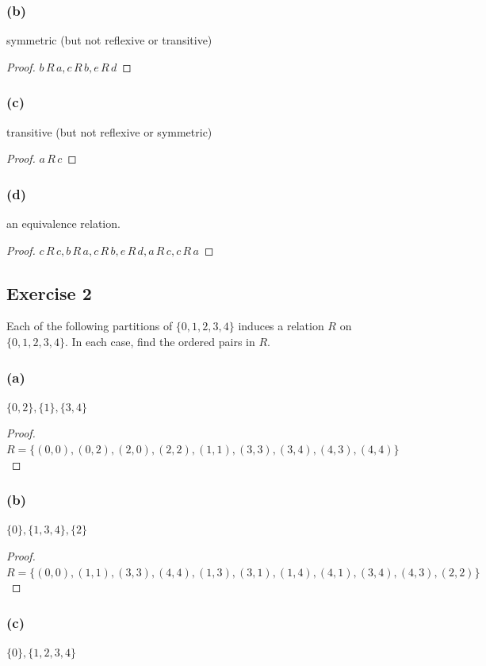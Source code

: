 \documentclass[14pt]{extarticle}
\begin{document}
\subsubsection{(b)}
symmetric (but not reflexive or transitive)
\begin{proof}
        \(b \,R\, a, c \,R\, b, e \,R\, d\)
\end{proof}

\subsubsection{(c)}
transitive (but not reflexive or symmetric)
\begin{proof}
        \(a \,R\, c\)
\end{proof}

\subsubsection{(d)}
an equivalence relation.
\begin{proof}
        \(c \,R\, c, b \,R\, a, c \,R\, b, e \,R\, d, a \,R\, c, c \,R\, a\)
\end{proof}

\subsection{Exercise 2}
Each of the following partitions of \(\{0, 1, 2, 3, 4\}\) induces a relation \(R\) on \(\{0, 1, 2, 3, 4\}\). In each
case, find the ordered pairs in \(R\).

\subsubsection{(a)}
\(\{0, 2\}, \{1\}, \{3, 4\}\)
\begin{proof}
        \(R = \{(0, 0), (0, 2), (2, 0), (2, 2), (1, 1), (3, 3), (3, 4), (4, 3), (4, 4)\}\)
\end{proof}

\subsubsection{(b)}
\(\{0\}, \{1, 3, 4\}, \{2\}\)
\begin{proof}
        \(R = \{(0,0),(1,1),(3,3),(4,4),(1,3),(3,1),(1,4),(4,1),(3,4),(4,3),(2,2)\}\)
\end{proof}

\subsubsection{(c)}
\(\{0\}, \{1, 2, 3, 4\}\)
\end{document}
